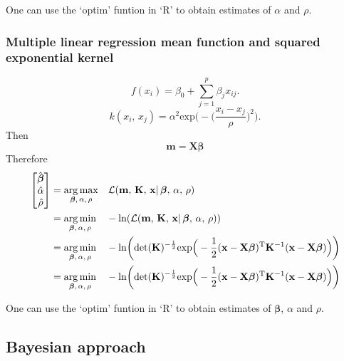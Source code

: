          One can use the `optim' funtion in `R' to obtain estimates of \(\alpha\) and \(\rho\).
      
      \subsubsection{Multiple linear regression mean function and squared exponential kernel}

         \[f(x_{i}) = \beta_{0} + \sum_{j=1}^{p} \beta_{j} x_{ij}.\]
         \[k(x_{i},\, x_{j}) = \alpha^{2} \text{exp} \bigg(- \Big(\frac{x_i - x_j}{\rho} \Big)^2 \bigg).\]
         Then \[\mathbf{m} = \mathbf{X}\boldsymbol{\beta}\]
         Therefore
         \begin{align*}
            \begin{bmatrix} \hat{\boldsymbol{\beta}} \\ \hat{\alpha} \\ \hat{\rho} \end{bmatrix}
            & = \underset{\boldsymbol{\beta} ,\, \alpha ,\, \rho}{\arg\max} \quad \mathcal{L}(\mathbf{m} ,\, \mathbf{K} ,\, \mathbf{x}| \, \boldsymbol{\beta} ,\, \alpha ,\, \rho)\\
            & = \underset{\boldsymbol{\beta} ,\, \alpha ,\, \rho}{\arg\min} \quad -\text{ln}(\mathcal{L}(\mathbf{m} ,\, \mathbf{K} ,\, \mathbf{x}| \, \boldsymbol{\beta} ,\, \alpha ,\, \rho))\\
            & = \underset{\boldsymbol{\beta} ,\, \alpha ,\, \rho}{\arg\min} \quad -\text{ln} \bigg(\text{det}(\mathbf{K})^{-\frac{1}{2}} 
            \text{exp} \Big(-\frac{1}{2} (\mathbf{x} - \mathbf{X}\boldsymbol{\beta})^{\text{\text{T}}} \mathbf{K}^{-1} (\mathbf{x} - \mathbf{X}\boldsymbol{\beta}) \Big) \bigg)\\
            & = \underset{\boldsymbol{\beta} ,\, \alpha ,\, \rho}{\arg\min} \quad -\text{ln} \bigg(\text{det}(\mathbf{K})^{-\frac{1}{2}} 
            \text{exp} \Big(-\frac{1}{2} (\mathbf{x} - \mathbf{X}\boldsymbol{\beta})^{\text{\text{T}}} \mathbf{K}^{-1} (\mathbf{x} - \mathbf{X}\boldsymbol{\beta}) \Big) \bigg)
         \end{align*}

         One can use the `optim' funtion in `R' to obtain estimates of \(\boldsymbol{\beta}\), \(\alpha\) and \(\rho\).
   
   \subsection{Bayesian approach}

